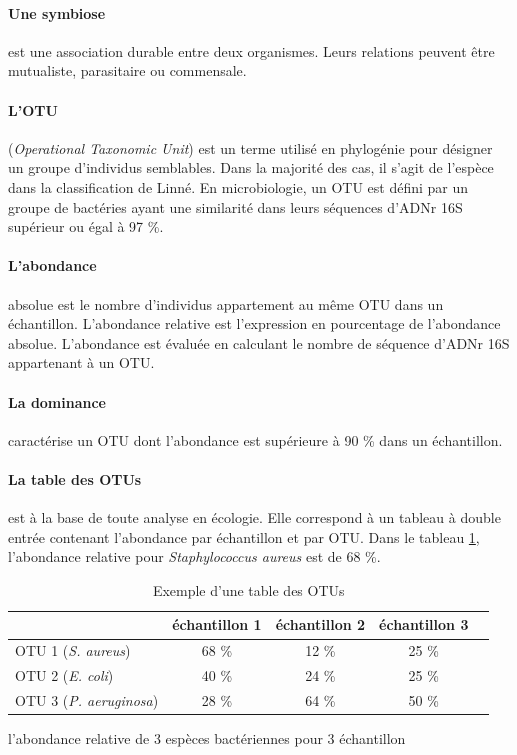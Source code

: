 \documentclass[12pt,a4paper]{article}
\begin{document}
\paragraph{Une symbiose} est une association durable entre deux organismes. Leurs relations peuvent être mutualiste, parasitaire ou commensale.


\paragraph{L'OTU}(\textit{Operational Taxonomic Unit}) est un terme utilisé en phylogénie pour désigner un groupe d’individus semblables. Dans la majorité des cas, il s'agit de l'espèce dans la classification de Linné.
En microbiologie, un OTU est défini par un groupe de bactéries ayant une similarité dans leurs séquences d'ADNr 16S supérieur ou égal à 97 \%.

\paragraph{L'abondance} absolue est le nombre d'individus appartement au même OTU dans un échantillon. 
L’abondance relative est l'expression en pourcentage de l'abondance absolue. L'abondance est évaluée en calculant le nombre de séquence d'ADNr 16S appartenant à un OTU.

\paragraph{La dominance} caractérise un OTU dont l'abondance est supérieure à 90 \% dans un échantillon.


\paragraph{La table des OTUs} est à la base de toute analyse en écologie. Elle correspond à un tableau à double entrée contenant l’abondance par échantillon et par OTU. Dans le tableau \ref{OTUTABLE}, l'abondance relative pour \textit{Staphylococcus aureus} est de 68 \%.

\begin{table}[h]
\begin{center}
\begin{tabular}{|l|c|c|c|c}
  \hline
   & échantillon 1 & échantillon 2 & échantillon 3  \\
  \hline
  OTU 1 (\textit{S. aureus}) & 68 \% & 12 \% & 25 \% \\
  OTU 2 (\textit{E. coli})& 40 \% & 24 \% & 25 \% \\
  OTU 3 (\textit{P. aeruginosa}) & 28 \% & 64 \% & 50 \% \\

  \hline
\end{tabular}
\end{center}
\caption{Exemple d'une table des OTUs}
\centering
l'abondance relative de 3 espèces bactériennes pour 3 échantillon
\label{OTUTABLE}
\end{table}
\end{document}
